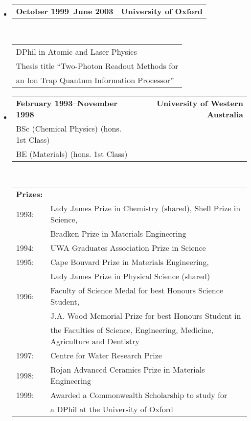 \documentclass[11pt,a4paper]{article}
\begin{document}
\begin{itemize}
  \item
    \begin{tabular*}{140mm}{l@{\extracolsep{\fill}}r}
      \textbf{October 1999--June 2003} & \textbf{University of Oxford}
    \end{tabular*}
    \\
    \begin{tabular*}{140mm}{l}
      DPhil in Atomic and Laser Physics \\
      Thesis title ``Two-Photon Readout Methods for\\
      an Ion Trap Quantum Information Processor'' \\
    \end{tabular*}
  \item
    \begin{tabular*}{140mm}{l@{\extracolsep{\fill}}r}
      \textbf{February 1993--November 1998} & 
      \textbf{University of Western Australia}\\
      BSc (Chemical Physics) (hons. 1st Class)& \\
      BE (Materials) (hons. 1st Class)&\\
    \end{tabular*}
    \\
    \begin{tabular*}{140mm}{ll}
      \textbf{Prizes:}\\
         1993: & Lady James Prize in Chemistry (shared), Shell Prize in
         Science, \\
         & Bradken Prize in Materials Engineering\\
         1994: & UWA Graduates Association Prize in Science\\
         1995: & Cape Bouvard Prize in Materials Engineering, \\
         & Lady James Prize in Physical Science (shared)\\
        1996: & Faculty of Science Medal for best Honours Science
        Student,\\
        & J.A. Wood Memorial Prize for best Honours Student in\\
        & the Faculties of Science, Engineering, Medicine, Agriculture
        and Dentistry\\
         1997: & Centre for Water Research Prize\\
         1998: & Rojan Advanced Ceramics Prize in Materials
         Engineering\\
         1999: & Awarded a Commonwealth Scholarship to study for\\
         & a DPhil at the University of Oxford
    \end{tabular*}

\end{itemize}
\end{document}
